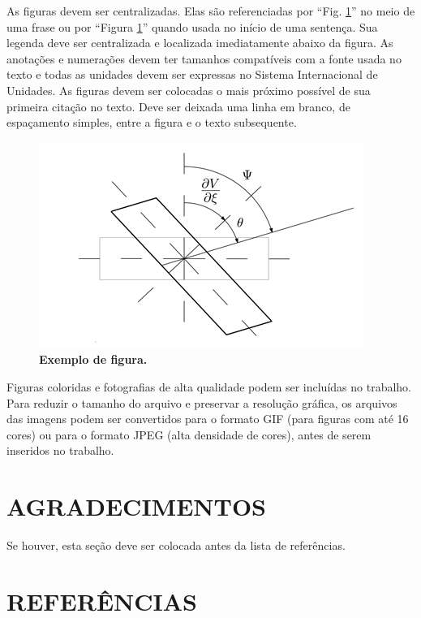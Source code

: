 \documentclass[10pt,fleqn,a4paper,twoside]{article}
\begin{document}
        As figuras devem ser centralizadas. Elas são referenciadas por ``Fig. \ref{fig:figexemplo}'' no meio de uma frase ou por ``Figura \ref{fig:figexemplo}'' quando usada no início de uma sentença. Sua legenda deve ser centralizada e localizada imediatamente abaixo da figura. As anotações e numerações devem ter tamanhos compatíveis com a fonte usada no texto e todas as unidades devem ser expressas no Sistema Internacional de Unidades. As figuras devem ser colocadas o mais próximo possível de sua primeira citação no texto. Deve ser deixada uma linha em branco, de espaçamento simples, entre a figura e o texto subsequente.
    
        \begin{figure}[h]
            \begin{center}
                \includegraphics[angle=0, scale=.8]{figura.png}
            \end{center}
            \caption{\textbf{Exemplo de figura.}}
            \label{fig:figexemplo}
        \end{figure}

        Figuras coloridas e fotografias de alta qualidade podem ser incluídas no trabalho. Para reduzir o tamanho do arquivo e preservar a resolução gráfica, os arquivos das imagens podem ser convertidos para o formato GIF (para figuras com até 16 cores) ou para o formato JPEG (alta densidade de cores), antes de serem inseridos no trabalho.

    \section{AGRADECIMENTOS}
    
        Se houver, esta seção deve ser colocada antes da lista de referências.


    \section{REFERÊNCIAS}
    
\end{document}
